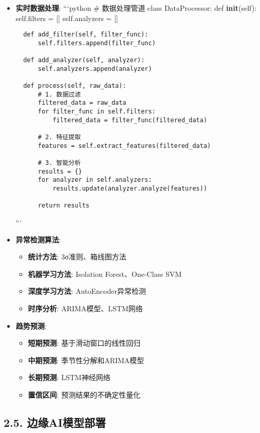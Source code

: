 \begin{itemize}
\item
  \textbf{实时数据处理}: ```python \# 数据处理管道 class DataProcessor:
  def \textbf{init}(self): self.filters = {[}{]} self.analyzers = {[}{]}

\begin{lstlisting}
  def add_filter(self, filter_func):
      self.filters.append(filter_func)

  def add_analyzer(self, analyzer):
      self.analyzers.append(analyzer)

  def process(self, raw_data):
      # 1. 数据过滤
      filtered_data = raw_data
      for filter_func in self.filters:
          filtered_data = filter_func(filtered_data)

      # 2. 特征提取
      features = self.extract_features(filtered_data)

      # 3. 智能分析
      results = {}
      for analyzer in self.analyzers:
          results.update(analyzer.analyze(features))

      return results
\end{lstlisting}

  ```
\item
  \textbf{异常检测算法}:

  \begin{itemize}
  \tightlist
  \item
    \textbf{统计方法}: 3σ准则、箱线图方法
  \item
    \textbf{机器学习方法}: Isolation Forest、One-Class SVM
  \item
    \textbf{深度学习方法}: AutoEncoder异常检测
  \item
    \textbf{时序分析}: ARIMA模型、LSTM网络
  \end{itemize}
\item
  \textbf{趋势预测}:

  \begin{itemize}
  \tightlist
  \item
    \textbf{短期预测}: 基于滑动窗口的线性回归
  \item
    \textbf{中期预测}: 季节性分解和ARIMA模型
  \item
    \textbf{长期预测}: LSTM神经网络
  \item
    \textbf{置信区间}: 预测结果的不确定性量化
  \end{itemize}
\end{itemize}

\subsection{2.5.
边缘AI模型部署}\label{ux8fb9ux7f18aiux6a21ux578bux90e8ux7f72}

